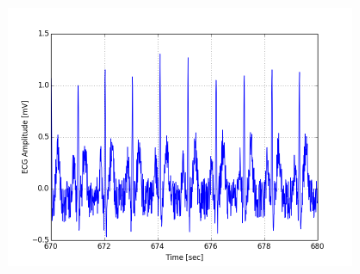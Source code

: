 \documentclass[paper=a4, fontsize=11pt]{scrartcl}
\numberwithin{equation}{section}		%
\numberwithin{figure}{section}			%
\numberwithin{table}{section}		    %
\begin{document}
\begin{appendices}
\begin{figure}[H]
\begin{subfigure}[b]{0.3\textwidth}
		\includegraphics[width=\textwidth]{sim/ecg_21}
	\end{subfigure}
\end{figure}


\end{appendices}
\end{document}
